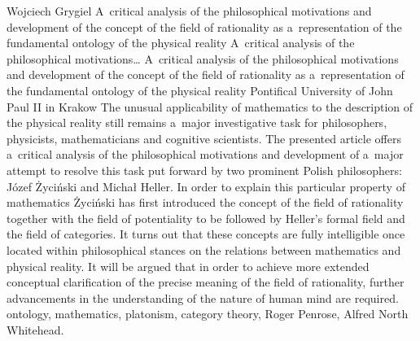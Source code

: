 \begin{artengenv}{Wojciech Grygiel}
	{A~critical analysis of the philosophical motivations and development of the concept of the field of rationality as a~representation of the fundamental ontology of the physical reality}
	{A~critical analysis of the philosophical motivations\ldots}
	{A~critical analysis of the philosophical motivations and development of the concept of the field of rationality as a~representation of the fundamental ontology of the physical reality}
	{Pontifical University of John Paul II in Krakow}
	{The unusual applicability of mathematics to the description of the physical reality still remains a~major investigative task for philosophers, physicists, mathematicians and cognitive scientists. The presented article offers a~critical analysis of the philosophical motivations and development of a~major attempt to resolve this task put forward by two prominent Polish philosophers: Józef Życiński and Michał Heller. In order to explain this particular property of mathematics Życiński has first introduced the concept of the field of rationality together with the field of potentiality to be followed by Heller's formal field and the field of categories. It turns out that these concepts are fully intelligible once located within philosophical stances on the relations between mathematics and physical reality. It will be argued that in order to achieve more extended conceptual clarification of the precise meaning of the field of rationality, further advancements in the understanding of the nature of human mind are required.}
	{ontology, mathematics, platonism, category theory, Roger Penrose, Alfred North Whitehead.}




\end{artengenv}
